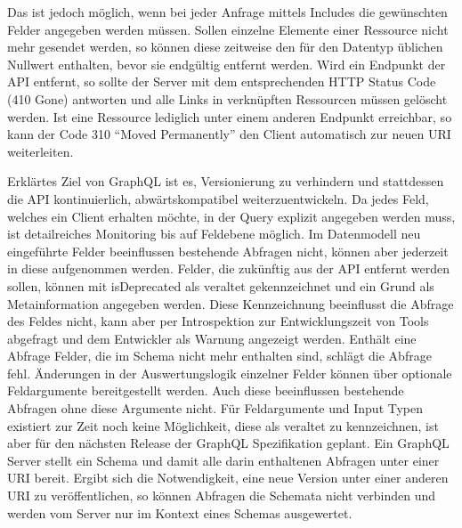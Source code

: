 Das ist jedoch möglich, wenn bei jeder Anfrage mittels Includes die gewünschten Felder angegeben werden müssen.
Sollen einzelne Elemente einer Ressource nicht mehr gesendet werden, so können diese zeitweise den für den Datentyp üblichen Nullwert enthalten, bevor sie endgültig entfernt werden.
Wird ein Endpunkt der API entfernt, so sollte der Server mit dem entsprechenden HTTP Status Code (410 Gone) antworten und alle Links in verknüpften Ressourcen müssen gelöscht werden.
Ist eine Ressource lediglich unter einem anderen Endpunkt erreichbar, so kann der Code 310 \enquote{Moved Permanently} den Client automatisch zur neuen URI weiterleiten.
\par
Erklärtes Ziel von GraphQL ist es, Versionierung zu verhindern und stattdessen die API kontinuierlich, abwärtskompatibel weiterzuentwickeln.
Da jedes Feld, welches ein Client erhalten möchte, in der Query explizit angegeben werden muss, ist detailreiches Monitoring bis auf Feldebene möglich.
Im Datenmodell neu eingeführte Felder beeinflussen bestehende Abfragen nicht, können aber jederzeit in diese aufgenommen werden.
Felder, die zukünftig aus der API entfernt werden sollen, können mit isDeprecated als veraltet gekennzeichnet und ein Grund als Metainformation angegeben werden.
Diese Kennzeichnung beeinflusst die Abfrage des Feldes nicht, kann aber per Introspektion zur Entwicklungszeit von Tools abgefragt und dem Entwickler als Warnung angezeigt werden.
Enthält eine Abfrage Felder, die im Schema nicht mehr enthalten sind, schlägt die Abfrage fehl.
Änderungen in der Auswertungslogik einzelner Felder können über optionale Feldargumente bereitgestellt werden.
Auch diese beeinflussen bestehende Abfragen ohne diese Argumente nicht.
Für Feldargumente und Input Typen existiert zur Zeit noch keine Möglichkeit, diese als veraltet zu kennzeichnen, ist aber für den nächsten Release der GraphQL Spezifikation geplant.
Ein GraphQL Server stellt ein Schema und damit alle darin enthaltenen Abfragen unter einer URI bereit.
Ergibt sich die Notwendigkeit, eine neue Version unter einer anderen URI zu veröffentlichen, so können Abfragen die Schemata nicht verbinden und werden vom Server nur im Kontext eines Schemas ausgewertet.
